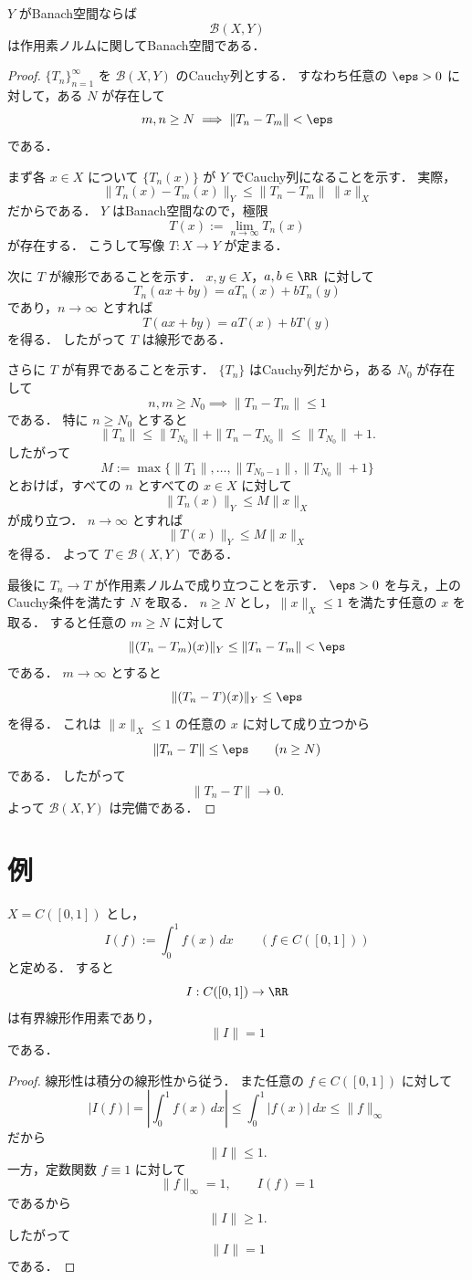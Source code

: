 \begin{theorem}
$Y$ がBanach空間ならば
\[
\mathcal B(X,Y)
\]
は作用素ノルムに関してBanach空間である．
\end{theorem}
\begin{proof}
$\{T_n\}_{n=1}^{\infty}$ を $\mathcal B(X,Y)$ のCauchy列とする．
すなわち任意の $\eps>0$ に対して，ある $N$ が存在して
\[
m,n\ge N
\implies
\|T_n-T_m\|<\eps
\]
である．

まず各 $x\in X$ について $\{T_n(x)\}$ が $Y$ でCauchy列になることを示す．
実際，
\[
\|T_n(x)-T_m(x)\|_Y
\le
\|T_n-T_m\|\,\|x\|_X
\]
だからである．
$Y$ はBanach空間なので，極限
\[
T(x):=\lim_{n\to\infty}T_n(x)
\]
が存在する．
こうして写像 $T:X\to Y$ が定まる．

次に $T$ が線形であることを示す．
$x,y\in X$，$a,b\in\RR$ に対して
\[
T_n(ax+by)=aT_n(x)+bT_n(y)
\]
であり，$n\to\infty$ とすれば
\[
T(ax+by)=aT(x)+bT(y)
\]
を得る．
したがって $T$ は線形である．

さらに $T$ が有界であることを示す．
$\{T_n\}$ はCauchy列だから，ある $N_0$ が存在して
\[
n,m\ge N_0 \implies \|T_n-T_m\|\le 1
\]
である．
特に $n\ge N_0$ とすると
\[
\|T_n\|\le \|T_{N_0}\|+\|T_n-T_{N_0}\|\le \|T_{N_0}\|+1.
\]
したがって
\[
M:=\max\{\|T_1\|,\dots,\|T_{N_0-1}\|,\|T_{N_0}\|+1\}
\]
とおけば，すべての $n$ とすべての $x\in X$ に対して
\[
\|T_n(x)\|_Y\le M\|x\|_X
\]
が成り立つ．
$n\to\infty$ とすれば
\[
\|T(x)\|_Y\le M\|x\|_X
\]
を得る．
よって $T\in\mathcal B(X,Y)$ である．

最後に $T_n\to T$ が作用素ノルムで成り立つことを示す．
$\eps>0$ を与え，上のCauchy条件を満たす $N$ を取る．
$n\ge N$ とし，$\|x\|_X\le 1$ を満たす任意の $x$ を取る．
すると任意の $m\ge N$ に対して
\[
\|(T_n-T_m)(x)\|_Y\le \|T_n-T_m\|<\eps
\]
である．
$m\to\infty$ とすると
\[
\|(T_n-T)(x)\|_Y\le \eps
\]
を得る．
これは $\|x\|_X\le 1$ の任意の $x$ に対して成り立つから
\[
\|T_n-T\|\le \eps
\qquad (n\ge N)
\]
である．
したがって
\[
\|T_n-T\|\to 0.
\]
よって $\mathcal B(X,Y)$ は完備である．
\end{proof}

\section{例}

\begin{example}[積分型線形汎関数]
$X=C([0,1])$ とし，
\[
I(f):=\int_0^1 f(x)\,dx
\qquad (f\in C([0,1]))
\]
と定める．
すると
\[
I:C([0,1])\to \RR
\]
は有界線形作用素であり，
\[
\|I\|=1
\]
である．
\end{example}
\begin{proof}
線形性は積分の線形性から従う．
また任意の $f\in C([0,1])$ に対して
\[
|I(f)|
=
\left|\int_0^1 f(x)\,dx\right|
\le
\int_0^1 |f(x)|\,dx
\le
\|f\|_\infty
\]
だから
\[
\|I\|\le 1.
\]
一方，定数関数 $f\equiv 1$ に対して
\[
\|f\|_\infty=1,
\qquad
I(f)=1
\]
であるから
\[
\|I\|\ge 1.
\]
したがって
\[
\|I\|=1
\]
である．
\end{proof}


